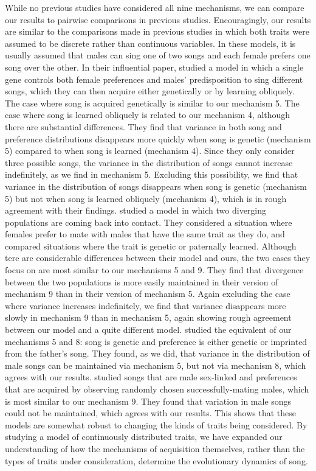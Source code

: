 \documentclass[12pt]{article}
\begin{document}
While no previous studies have considered all nine mechanisms, we can compare our results to pairwise comparisons in previous studies. Encouragingly, our results are similar to the comparisons made in previous studies in which both traits were assumed to be discrete rather than continuous variables. In these models, it is usually assumed that males can sing one of two songs and each female prefers one song over the other. In their influential paper, \citet{Lachlan:2004tg} studied a model in which a single gene controls both female preferences and males' predisposition to sing different songs, which they can then acquire either genetically or by learning obliquely. The case where song is acquired genetically is similar to our mechanism 5. The case where song is learned obliquely is related to our mechanism 4, although there are substantial differences. They find that variance in both song and preference distributions disappears more quickly when song is genetic (mechanism 5) compared to when song is learned (mechanism 4). Since they only consider three possible songs, the variance in the distribution of songs cannot increase indefinitely, as we find in mechanism 5. Excluding this possibility, we find that variance in the distribution of songs disappears when song is genetic (mechanism 5) but not when song is learned obliquely (mechanism 4), which is in rough agreement with their findings.   \citet{Yeh:2015bh} studied a model in which two diverging populations are coming back into contact. They considered a situation where females prefer to mate with males that have the same trait as they do, and compared situations where the trait is genetic or paternally learned. Although tere are considerable differences between their model and ours, the two cases they focus on are most similar to our mechanisms 5 and 9. They find that divergence between the two populations is more easily maintained in their version of mechanism 9 than in their version of mechanism 5. Again excluding the case where variance increases indefinitely, we find that variance disappears more slowly in mechanism 9 than in mechanism 5, again showing rough agreement between our model and a quite different model. \citet{Verzijden:2005vn} studied the equivalent of our mechanisms 5 and 8: song is genetic and preference is either genetic or imprinted from the father's song. They found, as we did, that variance in the distribution of male songs can be maintained via mechanism 5, but not via mechanism 8, which agrees with our results. \citet{Kirkpatrick:1994vn} studied songs that are male sex-linked and preferences that are acquired by observing randomly chosen successfully-mating males, which is most similar to our mechanism 9. They found that variation in male songs could not be maintained, which agrees with our results. This shows that these models are somewhat robust to changing the kinds of traits being considered. By studying a model of continuously distributed traits, we have expanded our understanding of how the mechanisms of acquisition themselves, rather than the types of traits under consideration, determine the evolutionary dynamics of song.
\end{document}
